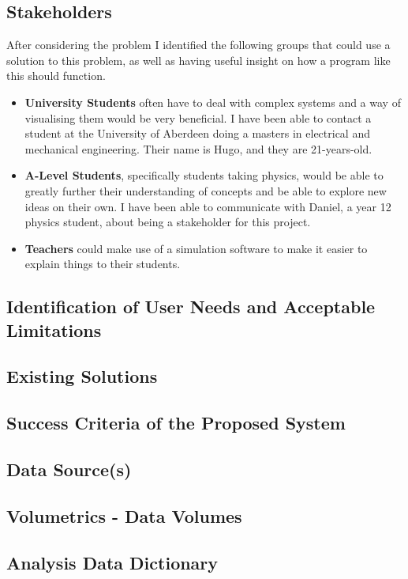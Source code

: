 \documentclass[11pt]{article}
\begin{document}
        \subsection{Stakeholders}
            After considering the problem I identified the following groups that could use a solution to this problem, as well as having useful insight on how a program like this should function.
            \begin{itemize}
                \item \textbf{University Students} often have to deal with complex systems and a way of visualising them would be very beneficial. I have been able to contact a student at the University of Aberdeen doing a masters in electrical and mechanical engineering. Their name is Hugo, and they are 21-years-old.
                \item \textbf{A-Level Students}, specifically students taking physics,  would be able to greatly further their understanding of concepts and be able to explore new ideas on their own. I have been able to communicate with Daniel, a year 12 physics student, about being a stakeholder for this project.
                \item \textbf{Teachers} could make use of a simulation software to make it easier to explain things to their students.
            \end{itemize}
            
        \subsection{Identification of User Needs and Acceptable Limitations}
        \subsection{Existing Solutions}
        \subsection{Success Criteria of the Proposed System}
        \subsection{Data Source(s)}
        \subsection{Volumetrics - Data Volumes}
        \subsection{Analysis Data Dictionary}
\end{document}
